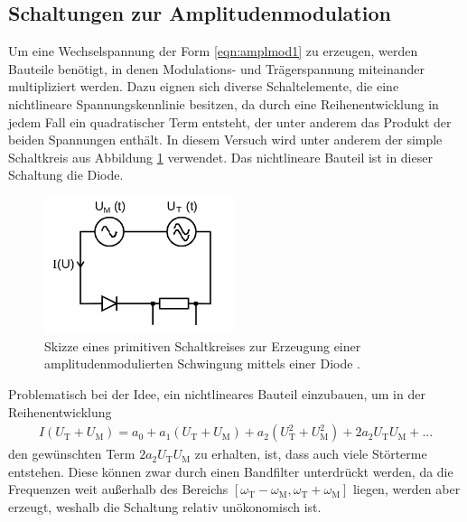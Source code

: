 \subsection{Schaltungen zur Amplitudenmodulation}
\label{sec:amplmodschaltung}

Um eine Wechselspannung der Form \eqref{eqn:amplmod1} zu erzeugen, werden Bauteile
benötigt, in denen Modulations- und Trägerspannung miteinander multipliziert werden.
Dazu eignen sich diverse Schaltelemente, die eine nichtlineare Spannungskennlinie besitzen,
da durch eine Reihenentwicklung in jedem Fall ein quadratischer Term entsteht, der
unter anderem das Produkt der beiden Spannungen enthält. In diesem Versuch wird unter
anderem der simple Schaltkreis aus Abbildung \ref{fig:primamplmodschaltung} verwendet. Das
nichtlineare Bauteil ist in dieser Schaltung die Diode.

\begin{figure}
  \centering
  \includegraphics[height=4cm]{JasperErsterSchultag/primamplmodschaltung.png}
  \caption{Skizze eines primitiven Schaltkreises zur Erzeugung einer amplitudenmodulierten Schwingung mittels einer Diode \cite{anleitung}.}
  \label{fig:primamplmodschaltung}
\end{figure}

Problematisch bei der Idee, ein nichtlineares Bauteil einzubauen, um in der Reihenentwicklung
\begin{align}
  I(U_\text{T} + U_\text{M}) = a_0 + a_1 (U_\text{T} + U_\text{M}) + a_2 (U_\text{T}^2 + U_\text{M}^2) + 2 a_2 U_\text{T} U_\text{M} + ...
\end{align}
den gewünschten Term $2 a_2 U_\text{T} U_\text{M}$ zu erhalten, ist, dass auch viele Störterme entstehen.
Diese können zwar durch einen Bandfilter unterdrückt werden, da die Frequenzen  weit außerhalb des Bereichs
$[\omega_\text{T} - \omega_\text{M},\omega_\text{T} + \omega_\text{M}]$ liegen, werden aber erzeugt,
weshalb die Schaltung relativ unökonomisch ist.


